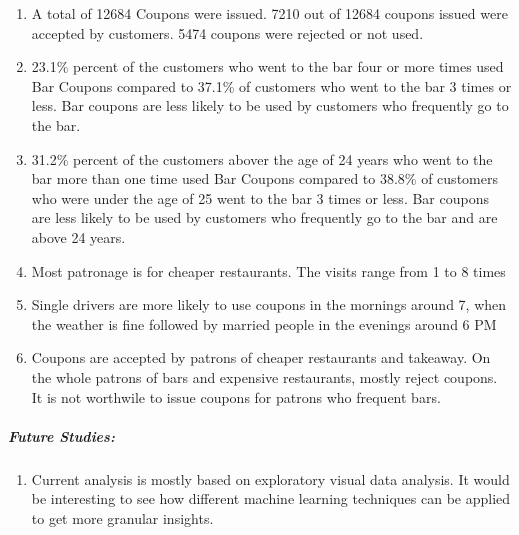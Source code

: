 \documentclass[11pt]{article}
\providecommand{\tightlist}{%
      \setlength{\itemsep}{0pt}\setlength{\parskip}{0pt}}
\begin{document}
\begin{enumerate}
\def\labelenumi{\arabic{enumi}.}
\tightlist
\item
  A total of 12684 Coupons were issued. 7210 out of 12684 coupons issued
  were accepted by customers. 5474 coupons were rejected or not used.
\item
  23.1\% percent of the customers who went to the bar four or more times
  used Bar Coupons compared to 37.1\% of customers who went to the bar 3
  times or less. Bar coupons are less likely to be used by customers who
  frequently go to the bar.
\item
  31.2\% percent of the customers abover the age of 24 years who went to
  the bar more than one time used Bar Coupons compared to 38.8\% of
  customers who were under the age of 25 went to the bar 3 times or
  less. Bar coupons are less likely to be used by customers who
  frequently go to the bar and are above 24 years.
\item
  Most patronage is for cheaper restaurants. The visits range from 1 to
  8 times
\item
  Single drivers are more likely to use coupons in the mornings around
  7, when the weather is fine followed by married people in the evenings
  around 6 PM
\item
  Coupons are accepted by patrons of cheaper restaurants and takeaway.
  On the whole patrons of bars and expensive restaurants, mostly reject
  coupons. It is not worthwile to issue coupons for patrons who frequent
  bars.
\end{enumerate}

    \subparagraph{Future Studies:}\label{future-studies}

\begin{enumerate}
\def\labelenumi{\arabic{enumi}.}
\tightlist
\item
  Current analysis is mostly based on exploratory visual data analysis.
  It would be interesting to see how different machine learning
  techniques can be applied to get more granular insights.
\end{enumerate}


    
    
    
    
\end{document}

